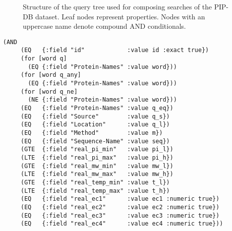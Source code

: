 \begin{figure}[t]
\centering
{}
\caption[Structure of the query tree for composing searches]
        {Structure of the query tree used for composing searches of
          the PIP-DB dataset. Leaf nodes represent properties. Nodes
          with an uppercase name denote compound AND conditionals.}
\label{fig:query-tree}
\end{figure}


\lstset{language=Clojure}
\begin{lstlisting}[label=lst:query-tree,caption={
      [Clojure implementation of the query tree]
      Implementation of the query tree in Clojure, from the file
      \texttt{query.clj}. Note the flat query hierarchy and the
      use of the \texttt{for} macro for expanding multivalued
      queries.}]
    (AND
     (EQ   {:field "id"            :value id :exact true})
     (for [word q]
       (EQ {:field "Protein-Names" :value word}))
     (for [word q_any]
       (EQ {:field "Protein-Names" :value word}))
     (for [word q_ne]
       (NE {:field "Protein-Names" :value word}))
     (EQ   {:field "Protein-Names" :value q_eq})
     (EQ   {:field "Source"        :value q_s})
     (EQ   {:field "Location"      :value q_l})
     (EQ   {:field "Method"        :value m})
     (EQ   {:field "Sequence-Name" :value seq})
     (GTE  {:field "real_pi_min"   :value pi_l})
     (LTE  {:field "real_pi_max"   :value pi_h})
     (GTE  {:field "real_mw_min"   :value mw_l})
     (LTE  {:field "real_mw_max"   :value mw_h})
     (GTE  {:field "real_temp_min" :value t_l})
     (LTE  {:field "real_temp_max" :value t_h})
     (EQ   {:field "real_ec1"      :value ec1 :numeric true})
     (EQ   {:field "real_ec2"      :value ec2 :numeric true})
     (EQ   {:field "real_ec3"      :value ec3 :numeric true})
     (EQ   {:field "real_ec4"      :value ec4 :numeric true}))
\end{lstlisting}


